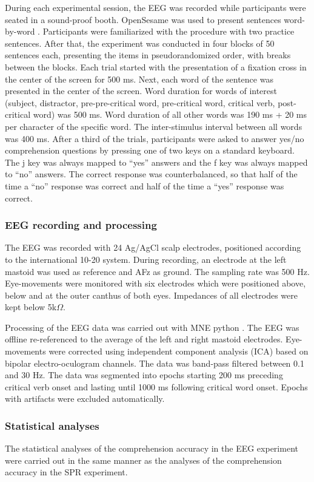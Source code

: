 \documentclass[a4paper, man, floatsintext]{apa7}
\begin{document}
During each experimental session, the EEG was recorded while participants were
seated in a sound-proof booth. OpenSesame was used to present sentences word-by-word \citep{opensesame}. Participants were familiarized with the procedure with two practice sentences. After that, the experiment was conducted in four blocks of 50 sentences each, presenting the items in pseudorandomized order, with breaks between the blocks. Each trial started with the presentation of a fixation cross in the center of the screen for 500 ms. Next, each word of the sentence was presented in the center of the screen. Word duration for words of interest (subject, distractor, pre-pre-critical word, pre-critical word, critical verb, post-critical word) was 500 ms. Word duration of all other words was 190 ms + 20 ms per character of the specific word. The inter-stimulus interval between all words was 400 ms. After a third of the trials, participants were asked to answer yes/no comprehension questions by pressing one of two keys on a standard keyboard. The j key was always mapped to ``yes'' answers and the f key was always mapped to ``no'' answers. The correct response was counterbalanced, so that half of the time a ``no'' response was correct and half of the time a ``yes'' response was correct. 

\subsubsection{EEG recording and processing}
The EEG was recorded with 24 Ag/AgCl scalp electrodes, positioned according to the international 10-20 system. During recording, an electrode at the left mastoid was used as reference and AFz as ground. The sampling rate was 500 Hz. Eye-movements were monitored with six electrodes which were positioned above, below and at the outer canthus of both eyes. Impedances of all electrodes were kept below 5k$\Omega$.

Processing of the EEG data was carried out with MNE python \citep{mne}. The EEG was offline re-referenced to the average of the left and right mastoid electrodes. Eye-movements were corrected using independent component analysis (ICA) based on bipolar electro-oculogram channels. The data was band-pass filtered between 0.1 and 30 Hz. The data was segmented into epochs starting 200 ms preceding critical verb onset and lasting until 1000 ms following critical word onset. Epochs with artifacts were excluded automatically.

\subsubsection{Statistical analyses}
The statistical analyses of the comprehension accuracy in the EEG experiment were carried out in the same manner as the analyses of the comprehension accuracy in the SPR experiment.
\end{document}
